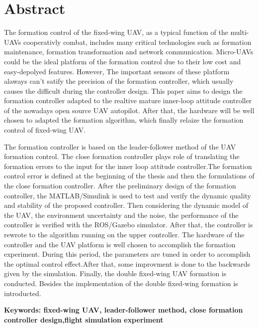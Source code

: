 \vspace*{17mm}

{\let\clearpage\relax \chapter*{
  \textmd{Abstract}\vskip -3bp}}
\setcounter{page}{2}

\setlength{\parskip}{0em}

The formation control of the fixed-wing UAV, as a typical function of the multi-UAVs cooperativly combat, includes many critical
technologies such as formation maintenance, formation transformation and network communication. Micro-UAVs could be the ideal 
platform of the formation control due to their low cost and easy-depolyed features. However, The important sensors of these platform
alaways can't satify the precision of the formation controller, which usually causes the difficult during the controller design.
This paper aims to design the formation controller adapted to the realtive mature inner-loop attitude controller of
the nowadays open source UAV autopilot. After that, the hardware will be well chosen to adapted the formation algorithm, which 
finally relaize the formation control of fixed-wing UAV.

The formation controller is based on the leader-follower method of the UAV formation control. The close formation controller
plays role of translating the formation errors to the input for the inner loop attitude controller.The formation control error
is defined at the beginning of the thesis and then the formulations of the close formation controller. After the preliminary
design of the formation controller, the MATLAB/Simulink is used to test and verify the dynamic quality and stability of the
proposed controller. Then considering the dynamic model of the  UAV, the environment uncertainty and the noise, the performance
of the controller is verified with the ROS/Gazebo simulator. After that, the controller is rewrote to the algorithm running on
the upper controller. The hardware of the controller and the UAV platform is well chosen to accomplish the formation experiment.
During this period, the parameters are tuned in order to accomplish the optimal control effect.After that, some improvment is 
done to the backwards given by the simulation.
Finally, the double fixed-wing UAV formation is conducted. Besides the implementation of the double fixed-wing formation is introducted.

\vspace{3ex}\noindent\textbf{Keywords: fixed-wing UAV, leader-follower method, close formation controller design,flight simulation experiment}
\newpage
